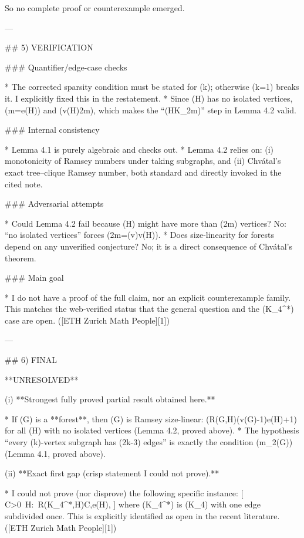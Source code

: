 So no complete proof or counterexample emerged.

---

## 5) VERIFICATION

### Quantifier/edge-case checks

* The corrected sparsity condition must be stated for (k); otherwise (k=1) breaks it. I explicitly fixed this in the restatement.
* Since (H) has no isolated vertices, (m=e(H)) and (v(H)\le 2m), which makes the “(H\subseteq K_{2m})” step in Lemma 4.2 valid.

### Internal consistency

* Lemma 4.1 is purely algebraic and checks out.
* Lemma 4.2 relies on: (i) monotonicity of Ramsey numbers under taking subgraphs, and (ii) Chvátal’s exact tree–clique Ramsey number, both standard and directly invoked in the cited note. 

### Adversarial attempts

* Could Lemma 4.2 fail because (H) might have more than (2m) vertices? No: “no isolated vertices” forces (2m=\sum \deg(v)\ge v(H)).
* Does size-linearity for forests depend on any unverified conjecture? No; it is a direct consequence of Chvátal’s theorem.

### Main goal

* I do not have a proof of the full claim, nor an explicit counterexample family. This matches the web-verified status that the general question and the (K_4^*) case are open. ([ETH Zurich Math People][1])

---

## 6) FINAL

**UNRESOLVED**

(i) **Strongest fully proved partial result obtained here.**

* If (G) is a **forest**, then (G) is Ramsey size-linear: (R(G,H)(v(G)-1)e(H)+1) for all (H) with no isolated vertices (Lemma 4.2, proved above).
* The hypothesis “every (k)-vertex subgraph has (\le 2k-3) edges” is exactly the condition (m_2(G)) (Lemma 4.1, proved above).

(ii) **Exact first gap (crisp statement I could not prove).**

* I could not prove (nor disprove) the following specific instance:
  [
  \exists C>0\ \forall H:\ R(K_4^*,H)\le C,e(H),
  ]
  where (K_4^*) is (K_4) with one edge subdivided once. This is explicitly identified as open in the recent literature. ([ETH Zurich Math People][1])

